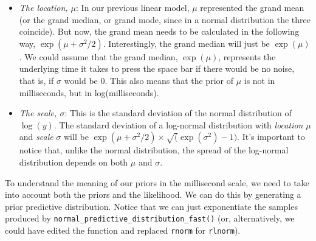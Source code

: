 \documentclass[12pt,]{krantz}
\newenvironment{Shaded}{\begin{snugshade}}{\end{snugshade}}
\newcommand{\DataTypeTok}[1]{\textcolor[rgb]{0.13,0.29,0.53}{#1}}
\newcommand{\DecValTok}[1]{\textcolor[rgb]{0.00,0.00,0.81}{#1}}
\newcommand{\KeywordTok}[1]{\textcolor[rgb]{0.13,0.29,0.53}{\textbf{#1}}}
\newcommand{\NormalTok}[1]{#1}
\newcommand{\OperatorTok}[1]{\textcolor[rgb]{0.81,0.36,0.00}{\textbf{#1}}}
\newcommand{\StringTok}[1]{\textcolor[rgb]{0.31,0.60,0.02}{#1}}
\providecommand{\tightlist}{%
  \setlength{\itemsep}{0pt}\setlength{\parskip}{0pt}}
\theoremstyle{definition}
\theoremstyle{definition}
\theoremstyle{definition}
\theoremstyle{remark}
\begin{document}
\begin{itemize}
\tightlist
\item
  \emph{The location, \(\mu\)}: In our previous linear model, \(\mu\) represented the grand mean (or the grand median, or grand mode, since in a normal distribution the three coincide). But now, the grand mean needs to be calculated in the following way, \(\exp(\mu +\sigma ^{2}/2)\). Interestingly, the grand median will just be \(\exp(\mu)\). We could assume that the grand median, \(\exp(\mu)\), represents the underlying time it takes to press the space bar if there would be no noise, that is, if \(\sigma\) would be 0. This also means that the prior of \(\mu\) is not in milliseconds, but in log(milliseconds).
\item
  \emph{The scale, \(\sigma\)}: This is the standard deviation of the normal distribution of \(\log(y)\). The standard deviation of a log-normal distribution with \emph{location} \(\mu\) and \emph{scale} \(\sigma\) will be \(\exp(\mu +\sigma ^{2}/2)\times \sqrt(\exp(\sigma^2)- 1)\). It's important to notice that, unlike the normal distribution, the spread of the log-normal distribution depends on both \(\mu\) and \(\sigma\).
\end{itemize}

To understand the meaning of our priors in the millisecond scale, we need to take into account both the priors and the likelihood. We can do this by generating a prior predictive distribution. Notice that we can just exponentiate the samples produced by \texttt{normal\_predictive\_distribution\_fast()} (or, alternatively, we could have edited the function and replaced \texttt{rnorm} for \texttt{rlnorm}).

\begin{Shaded}
\end{Shaded}
\end{document}

